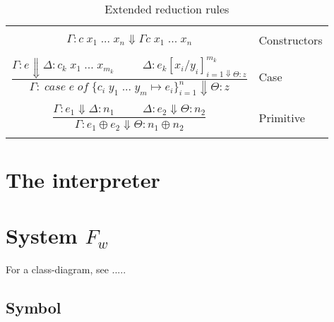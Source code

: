 \begin{table}
\centering
\begin{tabular}{|cl|}
\hline
& \\

$\Gamma : c \; x_1 \; ... \; x_n \Downarrow \Gamma c \; x_1 \; ... \; x_n$ & Constructors \\

& \\

$\dfrac{ \Gamma : e \Downarrow \Delta : c_k \; x_1 \; ... \; x_{m_k}  \;\;\;\;\;\;\;\;\; \Delta : e_k [x_i/y_i]^{m_k}_{i=1 \Downarrow \Theta : z} }{ \Gamma : \; case \; e \; of \; \{c_i \; y_1 \; ... \; y_m \mapsto e_i\}^{n}_{i=1} \Downarrow \Theta : z }$  & Case \\

& \\

$\dfrac{\Gamma : e_1 \Downarrow \Delta : n_1  \;\;\;\;\;\;\;\;\; \Delta : e_2 \Downarrow \Theta : n_2 }{ \Gamma : e_1 \oplus e_2 \Downarrow \Theta : n_1 \oplus n_2 }$  & Primitive \\

& \\

\hline
\end{tabular}

\caption{Extended reduction rules}

\end{table}






\section*{The interpreter}














\section*{System $F_w$}

For a class-diagram, see .....

\subsection*{Symbol}

